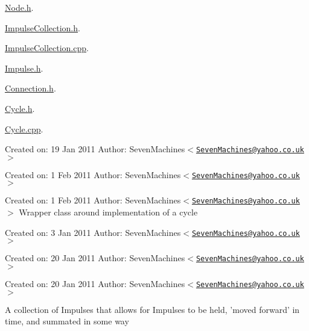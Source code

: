 \hyperlink{Node_8h}{\-Node.\-h}.

\hyperlink{ImpulseCollection_8h}{\-Impulse\-Collection.\-h}.

\hyperlink{ImpulseCollection_8cpp}{\-Impulse\-Collection.\-cpp}.

\hyperlink{Impulse_8h}{\-Impulse.\-h}.

\hyperlink{Connection_8h}{\-Connection.\-h}.

\hyperlink{Cycle_8h}{\-Cycle.\-h}.

\hyperlink{Cycle_8cpp}{\-Cycle.\-cpp}.

\-Created on\-: 19 \-Jan 2011 \-Author\-: \-Seven\-Machines$<$\href{mailto:SevenMachines@yahoo.co.uk}{\tt \-Seven\-Machines@yahoo.\-co.\-uk}$>$

\-Created on\-: 1 \-Feb 2011 \-Author\-: \-Seven\-Machines$<$\href{mailto:SevenMachines@yahoo.co.uk}{\tt \-Seven\-Machines@yahoo.\-co.\-uk}$>$

\-Created on\-: 1 \-Feb 2011 \-Author\-: \-Seven\-Machines$<$\href{mailto:SevenMachines@yahoo.co.uk}{\tt \-Seven\-Machines@yahoo.\-co.\-uk}$>$ \-Wrapper class around implementation of a cycle

\-Created on\-: 3 \-Jan 2011 \-Author\-: \-Seven\-Machines$<$\href{mailto:SevenMachines@yahoo.co.uk}{\tt \-Seven\-Machines@yahoo.\-co.\-uk}$>$

\-Created on\-: 20 \-Jan 2011 \-Author\-: \-Seven\-Machines$<$\href{mailto:SevenMachines@yahoo.co.uk}{\tt \-Seven\-Machines@yahoo.\-co.\-uk}$>$

\-Created on\-: 20 \-Jan 2011 \-Author\-: \-Seven\-Machines$<$\href{mailto:SevenMachines@yahoo.co.uk}{\tt \-Seven\-Machines@yahoo.\-co.\-uk}$>$

\-A collection of \-Impulses that allows for \-Impulses to be held, 'moved forward' in time, and summated in some way 